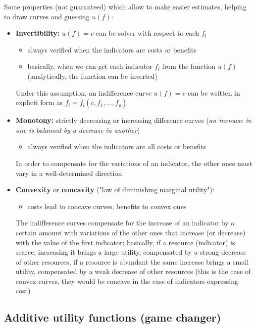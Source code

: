 Some properties (not guaranteed) which allow to make easier estimates, helping to draw curves and guessing $u(f)$:
\begin{itemize}
	\item \textbf{Invertibility:} $u(f)= c$ can be solver with respect to each $f_l$
	\begin{itemize}
		\item always verified when the indicators are costs or benefits
		
		\item basically, when we can get each indicator $f_l$ from the function $u(f)$ (analytically, the function can be inverted)
	\end{itemize}
	Under this assumption, an indifference curve $u(f) = c$ can be written in explicit form as $f_l = f_l (c, f_1, \dots, f_p)$
	
	\item \textbf{Monotony:} strictly decreasing or increasing difference curves (\textit{an increase in one is balanced by a decrease in another})
	\begin{itemize}
		\item always verified when the indicators are all costs or benefits
	\end{itemize}
	In order to compensate for the variations of an indicator, the other ones must vary in a well-determined direction
	
	\item \textbf{Convexity} or \textbf{concavity} ("law of diminishing marginal utility"): 
	\begin{itemize}
		\item costs lead to concave curves, benefits to convex ones
	\end{itemize}
	The indifference curves compensate for the increase of an indicator by a certain amount with variations of the other ones that increase (or decrease) with the value of the first indicator; basically, if a resource (indicator) is scarce, increasing it brings a large utility, compensated by a strong decrease of other resources, if a resource is abundant the same increase brings a small utility, compensated by a weak decrease of other resources (this is the case of convex curves, they would be concave in the case of indicators expressing cost)
\end{itemize}

\subsection{Additive utility functions (game changer)}
\label{subsec:additiveutil}

